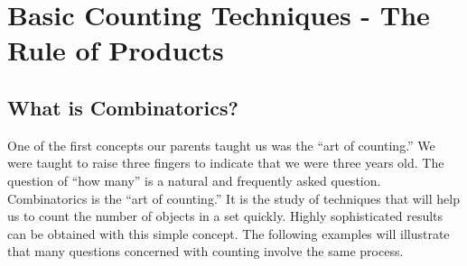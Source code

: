 \documentclass[10pt,]{book}
\theoremstyle{plain}
\theoremstyle{definition}
\theoremstyle{definition}
\theoremstyle{definition}
\begin{document}
\section[Basic Counting Techniques - The Rule of Products]{Basic Counting Techniques - The Rule of Products}\label{the-rule-of-products}
\typeout{************************************************}
\typeout{************************************************}
\subsection[What is Combinatorics?]{What is Combinatorics?}\label{What-is-Combinatorics}

 One of the first concepts our parents taught us was the ``art of counting.'' We were taught to raise three fingers to indicate that we were three years old. The question of ``how many'' is a natural and frequently asked question. Combinatorics is the ``art of counting.'' It is the study of techniques that will help us to count the number of objects in a set quickly. Highly sophisticated results can be obtained with this simple concept. The following examples will illustrate that many questions concerned with counting involve the same process.
%
\end{document}
